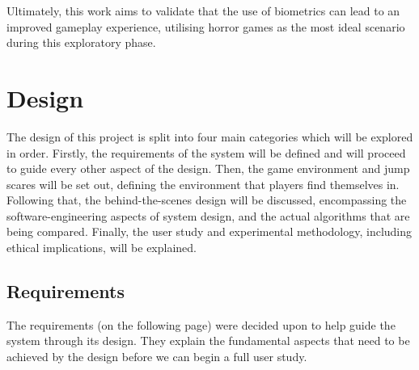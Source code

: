 \documentclass[12pt,a4paper]{article}
\begin{document}
Ultimately, this work aims to validate that the use of biometrics can lead to an improved gameplay experience, utilising horror games as the most ideal scenario during this exploratory phase.

\section{Design}






The design of this project is split into four main categories which will be explored in order. Firstly, the requirements of the system will be defined and will proceed to guide every other aspect of the design. Then, the game environment and jump scares will be set out, defining the environment that players find themselves in. Following that, the behind-the-scenes design will be discussed, encompassing the software-engineering aspects of system design, and the actual algorithms that are being compared. Finally, the user study and experimental methodology, including ethical implications, will be explained.

\subsection{Requirements}
The requirements (on the following page) were decided upon to help guide the system through its design. They explain the fundamental aspects that need to be achieved by the design before we can begin a full user study.
\end{document}
